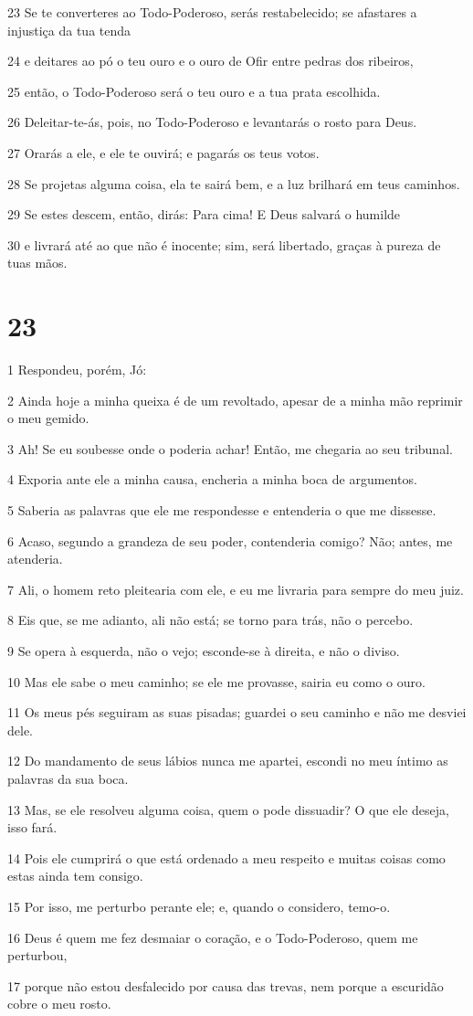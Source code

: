 \par 23 Se te converteres ao Todo-Poderoso, serás restabelecido; se afastares a injustiça da tua tenda
\par 24 e deitares ao pó o teu ouro e o ouro de Ofir entre pedras dos ribeiros,
\par 25 então, o Todo-Poderoso será o teu ouro e a tua prata escolhida.
\par 26 Deleitar-te-ás, pois, no Todo-Poderoso e levantarás o rosto para Deus.
\par 27 Orarás a ele, e ele te ouvirá; e pagarás os teus votos.
\par 28 Se projetas alguma coisa, ela te sairá bem, e a luz brilhará em teus caminhos.
\par 29 Se estes descem, então, dirás: Para cima! E Deus salvará o humilde
\par 30 e livrará até ao que não é inocente; sim, será libertado, graças à pureza de tuas mãos.

\chapter{23}

\par 1 Respondeu, porém, Jó:
\par 2 Ainda hoje a minha queixa é de um revoltado, apesar de a minha mão reprimir o meu gemido.
\par 3 Ah! Se eu soubesse onde o poderia achar! Então, me chegaria ao seu tribunal.
\par 4 Exporia ante ele a minha causa, encheria a minha boca de argumentos.
\par 5 Saberia as palavras que ele me respondesse e entenderia o que me dissesse.
\par 6 Acaso, segundo a grandeza de seu poder, contenderia comigo? Não; antes, me atenderia.
\par 7 Ali, o homem reto pleitearia com ele, e eu me livraria para sempre do meu juiz.
\par 8 Eis que, se me adianto, ali não está; se torno para trás, não o percebo.
\par 9 Se opera à esquerda, não o vejo; esconde-se à direita, e não o diviso.
\par 10 Mas ele sabe o meu caminho; se ele me provasse, sairia eu como o ouro.
\par 11 Os meus pés seguiram as suas pisadas; guardei o seu caminho e não me desviei dele.
\par 12 Do mandamento de seus lábios nunca me apartei, escondi no meu íntimo as palavras da sua boca.
\par 13 Mas, se ele resolveu alguma coisa, quem o pode dissuadir? O que ele deseja, isso fará.
\par 14 Pois ele cumprirá o que está ordenado a meu respeito e muitas coisas como estas ainda tem consigo.
\par 15 Por isso, me perturbo perante ele; e, quando o considero, temo-o.
\par 16 Deus é quem me fez desmaiar o coração, e o Todo-Poderoso, quem me perturbou,
\par 17 porque não estou desfalecido por causa das trevas, nem porque a escuridão cobre o meu rosto.

